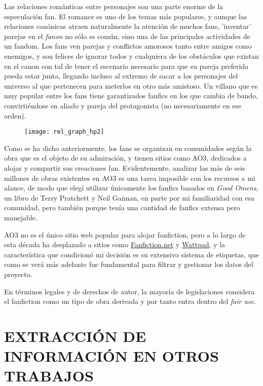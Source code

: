 \documentclass{pre-tfg}
\begin{document}
Las relaciones románticas entre personajes son una parte enorme de la especulación fan. El romance es uno de los temas más populares, y aunque las relaciones canónicas atraen naturalmente la atención de muchos fans, 'inventar' parejas en el \textit{fanon} no sólo es común, sino una de las principales actividades de un fandom. Los fans ven parejas y conflictos amorosos tanto entre amigos como enemigos, y son felices de ignorar todos y cualquiera de los obstáculos que existan en el canon con tal de tener el escenario necesario para que su pareja preferida pueda estar junta, llegando incluso al extremo de sacar a los personajes del universo al que pertenecen para meterlos en otro más amistoso. Un villano que es muy popular entre los fans tiene garantizados fanfics en los que cambia de bando, convirtiéndose en aliado y pareja del protagonista (no necesariamente en ese orden).

\begin{figure}
	\texttt{[image: rel\_graph\_hp2]}
	\label{fig:graph_hp}
	\centering
\end{figure}


Como se ha dicho anteriormente, los fans se organizan en comunidades según la obra que es el objeto de su admiración, y tienen sitios como AO3, dedicados a alojar y compartir sus creaciones fan. Evidentemente, analizar las más de seis millones de obras existentes en AO3 es una tarea imposible con los recursos a mi alance, de modo que elegí utilizar únicamente los fanfics basados en \textit{Good Omens}, un libro de Terry Pratchett y Neil Gaiman, en parte por mi familiaridad con esa comunidad, pero también porque tenía una cantidad de fanfics extensa pero manejable.

AO3 no es el único sitio web popular para alojar fanfiction, pero a lo largo de esta década ha desplazado a sitios como \href{http://fanfiction.net}{Fanfiction.net} y \href{https://www.wattpad.com/}{Wattpad}, y la característica que condicionó mi decisión es su extensivo sistema de etiquetas, que como se verá más adelante fue fundamental para filtrar y gestionar los datos del proyecto.

En términos legales y de derechos de autor, la mayoría de legislaciones considera el fanfiction como un tipo de obra derivada \cite{woosh_1998} y por tanto entra dentro del \textit{fair use}.


\section{EXTRACCIÓN DE INFORMACIÓN EN OTROS TRABAJOS}
\end{document}
